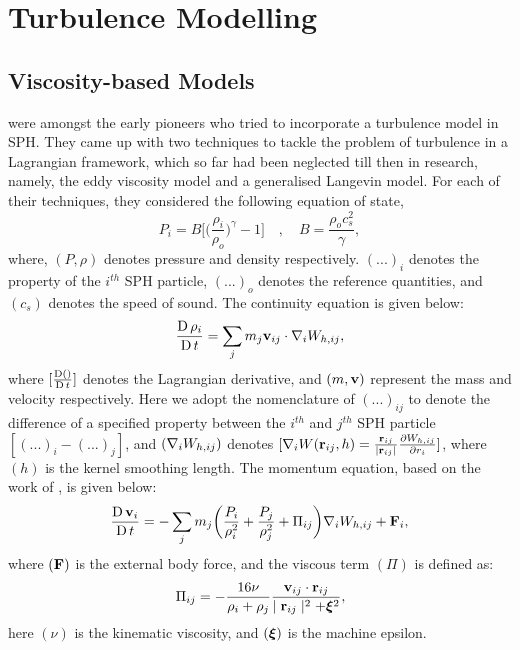 
\chapter{Turbulence Modelling} %

\label{chap:turbulence-modelling}
\section{Viscosity-based Models}
\label{sec:visc-based-model}
\cite{VIOLEAU2002} were amongst the early pioneers who tried to incorporate a turbulence model in SPH. They came up with two techniques to tackle the problem of turbulence in a Lagrangian framework, which so far had been neglected till then in research, namely, the eddy viscosity model and a generalised Langevin model. For each of their techniques, they considered the following equation of state, 
\begin{equation}
    P_i = B \Bigg[ \bigg( \frac{\rho_i}{\rho_o} \bigg)^{\gamma} - 1 \Bigg] \quad , \quad B = \frac{\rho_o c_s^2}{\gamma},
    \label{eq:violeau-eos}
\end{equation}
where, $(P, \rho)$ denotes pressure and density respectively. $(...)_i$ denotes the property of the $i^{th}$ SPH particle, $(...)_o$ denotes the reference quantities, and $(c_s)$ denotes the speed of sound.
The continuity equation is given below:
\begin{equation}
    \LagDerivative{\rho_i} = \sum_j m_j \VIJ \cdot \DWIJ,
    \label{eq:violeau-continuity}
\end{equation}
where $[\LagDerivative{()}]$ denotes the Lagrangian derivative, and $(m, \vect{v})$ represent the mass and velocity respectively.
Here we adopt the nomenclature of $(...)_{ij}$ to denote the difference of a specified property between the $i^{th}$ and $j^{th}$ SPH particle $[(...)_{i} - (...)_{j}]$, and $(\DWIJ)$ denotes $[\nabla_i W(\RIJ,h) = \frac{\RIJ}{\RtwoIJ[]} \PartialDerivative[r_i]{\WIJ}]$, where $(h)$ is the kernel smoothing length.
The momentum equation, based on the work of \cite{Monaghan1992}, is given below:   
\begin{equation}
    \LagDerivative{\vect{v}_i} = - \sum_j m_j \bigg( \frac{P_i}{\rho_i^2} + \frac{P_j}{\rho_j^2} + \Pi_{ij} \bigg) \DWIJ + \vect{F}_i,
    \label{eq:violeau-mom}
\end{equation}
where $(\vect{F})$ is the external body force, and the viscous term $(\Pi)$ is defined as:
\begin{equation}
    \Pi_{ij} = - \frac{16\nu}{\rho_i + \rho_j} \frac{\VIJ \cdot \RIJ}{\RtwoIJ + \MachineEpsilon^2},
    \label{eq:violeau-diffusion-term}
\end{equation}
here $(\nu)$ is the kinematic viscosity, and $(\MachineEpsilon)$ is the machine epsilon.


